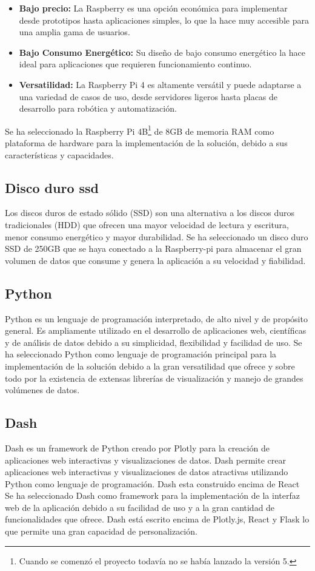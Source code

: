 \begin{itemize}
	\item \textbf{Bajo precio:} La Raspberry es una opción económica para implementar desde prototipos hasta aplicaciones simples, lo que la hace muy accesible para una amplia gama de usuarios.
	\item \textbf{Bajo Consumo Energético:} Su diseño de bajo consumo energético la hace ideal para aplicaciones que requieren funcionamiento continuo.
	\item \textbf{Versatilidad:} La Raspberry Pi 4 es altamente versátil y puede adaptarse a una variedad de casos de uso, desde servidores ligeros hasta placas de desarrollo para robótica y automatización.
\end{itemize}
Se ha seleccionado la Raspberry Pi 4B\footnote{Cuando se comenzó el proyecto todavía no se había lanzado la versión 5.} de 8GB de memoria RAM como plataforma de hardware para la implementación de la solución, debido a sus características y capacidades.

\subsection*{Disco duro ssd}
Los discos duros de estado sólido (SSD) son una alternativa a los discos duros tradicionales (HDD) que ofrecen una mayor velocidad de lectura y escritura, menor consumo energético y mayor durabilidad. Se ha seleccionado un disco duro SSD de 250GB que se haya conectado a la Raspberry-pi para almacenar el gran volumen de datos que consume y genera la aplicación a su velocidad y fiabilidad.

\subsection*{Python}
Python es un lenguaje de programación interpretado, de alto nivel y de propósito general. Es ampliamente utilizado en el desarrollo de aplicaciones web, científicas y de análisis de datos debido a su simplicidad, flexibilidad y facilidad de uso. Se ha seleccionado Python como lenguaje de programación principal para la implementación de la solución debido a la gran versatilidad que ofrece y sobre todo por la existencia de extensas librerías de visualización y manejo de grandes volúmenes de datos.

\subsection*{Dash}
Dash es un framework de Python creado por Plotly para la creación de aplicaciones web interactivas y visualizaciones de datos. Dash permite crear aplicaciones web interactivas y visualizaciones de datos atractivas utilizando Python como lenguaje de programación. Dash esta construido encima de React Se ha seleccionado Dash como framework para la implementación de la interfaz web de la aplicación debido a su facilidad de uso y a la gran cantidad de funcionalidades que ofrece. Dash está escrito encima de Plotly.js, React y Flask lo que permite una gran capacidad de personalización.


